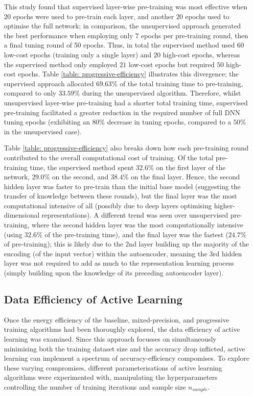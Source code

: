 \documentclass[a4paper, 11pt]{report}
\begin{document}
    This study found that supervised layer-wise pre-training was most effective when $20$ epochs were used to pre-train each layer, and another $20$ epochs used to optimise the full network; in comparison, the unsupervised approach generated the best performance when employing only $7$ epochs per pre-training round, then a final tuning round of 50 epochs. Thus, in total the supervised method used $60$ low-cost epochs (training only a single layer) and $20$ high-cost epochs, whereas the supervised method only employed $21$ low-cost epochs but required $50$ high-cost epochs. Table \ref{table: progressive-efficiency} illustrates this divergence; the supervised approach allocated $69.63\%$ of the total training time to pre-training, compared to only $33.59\%$ during the unsupervised algorithm. Therefore, whilst unsupervised layer-wise pre-training had a shorter total training time, supervised pre-training facilitated a greater reduction in the required number of full DNN tuning epochs (exhibiting an $80\%$ decrease in tuning epochs, compared to a $50\%$ in the unsupervised case).

    Table \ref{table: progressive-efficiency} also breaks down how each pre-training round contributed to the overall computational cost of training. Of the total pre-training time, the supervised method spent $32.6\%$ on the first layer of the network, $29.0\%$ on the second, and $38.4\%$ on the final layer. Hence, the second hidden layer was faster to pre-train than the initial base model (suggesting the transfer of knowledge between these rounds), but the final layer was the most computational intensive of all (possibly due to deep layers optimising higher-dimensional representations). A different trend was seen over unsupervised pre-training, where the second hidden layer was the most computationally intensive (using $32.6\%$ of the pre-training time), and the final layer was the fastest ($24.7\%$ of pre-training); this is likely due to the 2nd layer building up the majority of the encoding (of the input vector) within the autoencoder, meaning the 3rd hidden layer was not required to add as much to the representation learning process (simply building upon the knowledge of its preceding autoencoder layer).


    \subsection{Data Efficiency of Active Learning}

    Once the energy efficiency of the baseline, mixed-precision, and progressive training algorithms had been thoroughly explored, the data efficiency of active learning was examined. Since this approach focusses on simultaneously minimising both the training dataset size and the accuracy drop inflicted, active learning can implement a spectrum of accuracy-efficiency compomises. To explore these varying compromises, different parameterisations of active learning algorithms were experimented with, manipulating the hyperparameters controlling the number of training iterations and sample size $n_{sample}$. 
\end{document}

